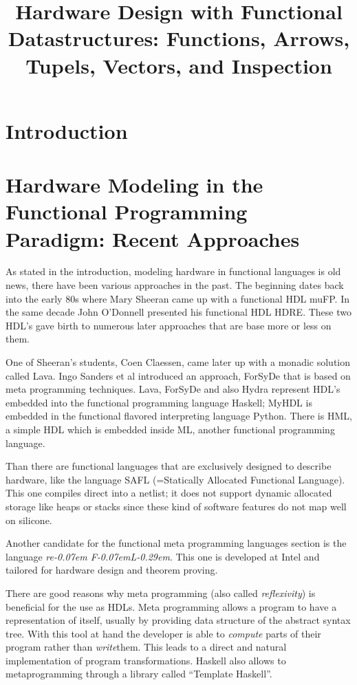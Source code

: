 \documentclass[11pt,final,a4paper]{article}
\title{Hardware Design with Functional Datastructures: Functions, Arrows, Tupels, Vectors, and Inspection}
\newcommand{\reFLect}{\textit{re\kern-0.07em F\kern-0.07emL\kern-0.29em\raisebox{0.56ex}{ect}}}
\begin{document}
\section{Introduction}

\section{Hardware Modeling in the Functional Programming Paradigm: Recent Approaches}
\label{recent_approaches}
As stated in the introduction, modeling hardware in functional languages is old news, there have been various approaches in the
past. The beginning dates back into the early 80s where Mary Sheeran came up with a functional HDL muFP\cite{sheeran:muFP}. In the
same decade John O'Donnell presented his functional HDL HDRE\cite{hydra:old,donnell}. These two HDL's gave birth to numerous later
approaches that are base more or less on them.

One of Sheeran's students, Coen Claessen, came later up with a monadic solution called Lava\cite{claessen:hardware}. Ingo Sanders
et al introduced an approach, ForSyDe \cite{forsyde:phd,forsyde:ieee} that is based on meta programming techniques. Lava, ForSyDe
and also Hydra %
represent HDL's embedded into the functional programming language Haskell; MyHDL \cite{myhdl} is embedded in the functional
flavored interpreting language Python. There is HML\cite{hml}, a simple HDL which is embedded inside ML, another functional
programming language.

Than there are functional languages that are exclusively designed to describe hardware, like the language SAFL (=Statically
Allocated Functional Language)\cite{sharp,sharp:flash,sharp:codesign}. This one compiles direct into a netlist; it does not
support dynamic allocated storage like heaps or stacks since these kind of software features do not map well on silicone.

Another candidate for the functional meta programming languages section is the language \reFLect \cite{reflect}. This one is
developed at Intel and tailored for hardware design and theorem proving.

There are good reasons why meta programming (also called \emph{reflexivity}) is beneficial for the use as HDLs. Meta programming
allows a program to have a representation of itself, usually by providing data structure of the abstract syntax tree. With this
tool at hand the developer is able to \emph{compute} parts of their program rather than \emph{write}them. This leads to a direct
and natural implementation of program transformations. Haskell also allows to metaprogramming through a library called ``Template
Haskell''\cite{haskell:template}.
\end{document}
